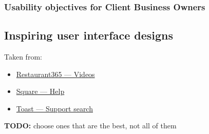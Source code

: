 \documentclass[]{VUMIFTemplateClass}
\newcommand{\todocomment}[1]{%
    \begin{tcolorbox}[colback=red!20, colframe=red!60, arc=0pt, outer arc=0pt, boxrule=1pt, left=3pt, right=3pt, top=3pt, bottom=3pt]
        \textbf{\textcolor{orange!70!black}{TODO:}} #1
    \end{tcolorbox}
}
\begin{document}
\subsubsection{Usability objectives for Client Business Owners}

\subsection{Inspiring user interface designs}


Taken from:
\begin{itemize}
     \item \href{https://www.restaurant365.com/resource-category/videos/}{Restaurant365 — Videos}
     \item \href{https://squareup.com/help/us/en}{Square — Help}
     \item \href{https://support.toasttab.com/search/#f-100=Account%20Settings%20%26%20Billing,Marketing,Menu%20%26%20Items,POS%20%26%20Location%20Operations,Takeout%20%26%20Catering&f-@commonsource=Videos&f-@language=English}{Toast — Support search}
\end{itemize}

\todocomment{choose ones that are the best, not all of them}
\end{document}

